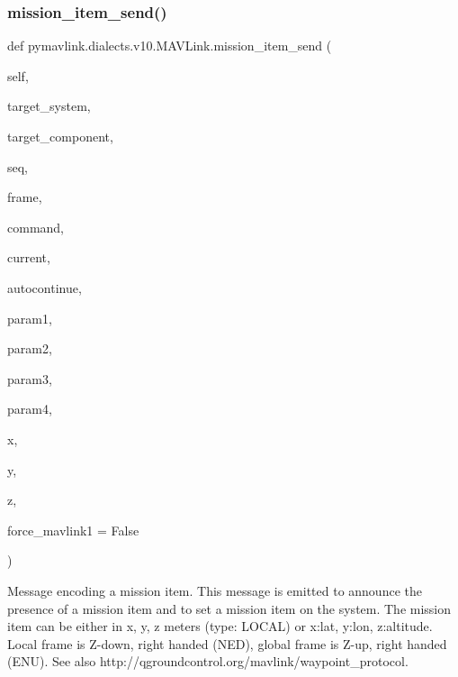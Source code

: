 \begin{DoxyVerb}
\begin{DoxyVerb}
\begin{DoxyVerb}
\begin{DoxyVerb}
\subsubsection{\texorpdfstring{mission\+\_\+item\+\_\+send()}{mission\_item\_send()}}
{\footnotesize\ttfamily def pymavlink.\+dialects.\+v10.\+M\+A\+V\+Link.\+mission\+\_\+item\+\_\+send (\begin{DoxyParamCaption}\item[{}]{self,  }\item[{}]{target\+\_\+system,  }\item[{}]{target\+\_\+component,  }\item[{}]{seq,  }\item[{}]{frame,  }\item[{}]{command,  }\item[{}]{current,  }\item[{}]{autocontinue,  }\item[{}]{param1,  }\item[{}]{param2,  }\item[{}]{param3,  }\item[{}]{param4,  }\item[{}]{x,  }\item[{}]{y,  }\item[{}]{z,  }\item[{}]{force\+\_\+mavlink1 = {\ttfamily False} }\end{DoxyParamCaption})}

\begin{DoxyVerb}Message encoding a mission item. This message is emitted to announce
the presence of a mission item and to set a mission
item on the system. The mission item can be either in
x, y, z meters (type: LOCAL) or x:lat, y:lon,
z:altitude. Local frame is Z-down, right handed (NED),
global frame is Z-up, right handed (ENU). See also
http://qgroundcontrol.org/mavlink/waypoint_protocol.


\end{DoxyVerb}
\end{DoxyVerb}
\end{DoxyVerb}
\end{DoxyVerb}
\end{DoxyVerb}
